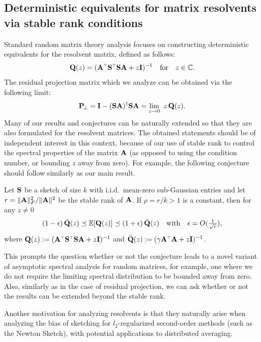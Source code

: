 \documentclass[11pt]{article}
\begin{document}
\subsection{Deterministic equivalents for matrix resolvents via 
  stable rank conditions}
Standard random matrix theory analysis focuses on constructing
deterministic equivalents for the resolvent matrix, defined as
follows:
\begin{align*}
  \Q(z) = (\A^\top\S^\top\S\A + z\I)^{-1}\quad\text{for}\quad z\in\mathbb{C}.
\end{align*}
The residual projection matrix which we analyze can be obtained via
the following limit:
\begin{align*}
  \P_{\!\perp}= \I - (\S\A)^\dagger\S\A =  \lim_{z\rightarrow 0}\ z\,\Q(z).
\end{align*}
Many of our results and conjectures can be naturally extended so that
they are also formulated for the resolvent matrices. The obtained
statements should be of independent interest in this context, because
of our use of stable rank to control the spectral properties of the
matrix $\A$ (as opposed to using the condition number, or bounding $z$
away from zero). For example, the following conjecture should follow
similarly as our main result.
\begin{conjecture}
  Let $\S$ be a sketch of size $k$ with i.i.d.~mean-zero sub-Gaussian entries and let
  $r=\|\A\|_F^2/\|\A\|^2$ be the stable rank of $\A$.  If
$\rho = r/k>1$ is a constant, then for
  any $z\neq 0$
  \begin{align*}
    (1-\epsilon)\,\bar\Q(z)\preceq\E[\Q(z)]\preceq
    (1+\epsilon)\,\bar\Q(z)\quad\text{with}\quad \epsilon =
    O(\tfrac1{\sqrt r}),
  \end{align*}
  where $\Q(z) := (\A^\top\S^\top\S\A + z\I)^{-1}$ and $\bar\Q(z):=(\gamma\A^\top\A +
  z\I)^{-1}$.
\end{conjecture}

\noindent
This prompts the question whether or not the conjecture leads to
a novel variant of asymptotic spectral analysis for random matrices, for example, one where we do
not require the limiting spectral distribution to be bounded away from
zero. Also, similarly as in the case of residual projection, we can
ask whether or not the results can be extended beyond the stable rank.

Another motivation for analyzing resolvents is that they naturally
arise when analyzing the bias of sketching for $l_2$-regularized
second-order methods (such as the Newton Sketch), with potential applications to distributed averaging.
\end{document}

